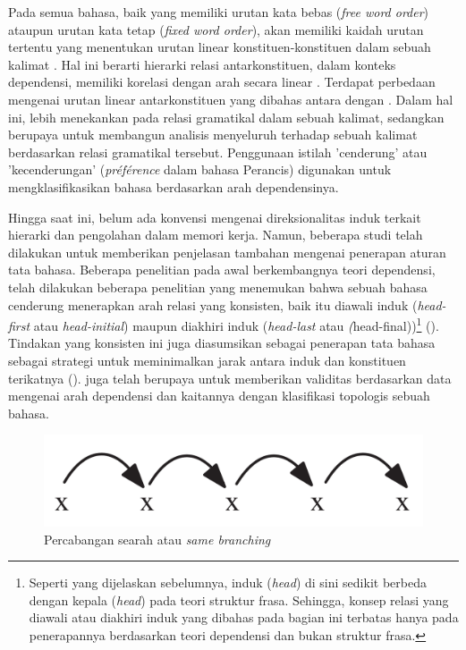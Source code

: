 Pada semua bahasa, baik yang memiliki urutan kata bebas (\textit{free word order}) ataupun urutan kata tetap (\textit{fixed word order}), akan memiliki kaidah urutan tertentu yang menentukan urutan linear konstituen-konstituen dalam sebuah kalimat \citep{tesniere1959elements}. Hal ini berarti hierarki relasi antarkonstituen, dalam konteks dependensi, memiliki korelasi dengan arah secara linear \citep{greenberg1963some}. Terdapat perbedaan mengenai urutan linear antarkonstituen yang dibahas antara \cite{tesniere1959elements} dengan \cite{greenberg1963some}.  Dalam hal ini, \cite{greenberg1963some} lebih menekankan pada relasi gramatikal dalam sebuah kalimat, sedangkan \cite{tesniere1959elements} berupaya untuk membangun analisis menyeluruh terhadap sebuah kalimat berdasarkan relasi gramatikal tersebut. Penggunaan istilah 'cenderung' atau 'kecenderungan' (\textit{pr{\'e}f{\'e}rence} dalam bahasa Perancis) digunakan \cite{tesniere1959elements} untuk mengklasifikasikan bahasa berdasarkan arah dependensinya.

Hingga saat ini, belum ada konvensi mengenai direksionalitas induk terkait hierarki dan pengolahan dalam memori kerja. Namun, beberapa studi telah dilakukan untuk memberikan penjelasan tambahan mengenai penerapan aturan tata bahasa. Beberapa penelitian pada awal berkembangnya teori dependensi, telah dilakukan beberapa penelitian yang menemukan bahwa sebuah bahasa cenderung menerapkan arah relasi yang konsisten, baik itu diawali induk (\textit{head-first} atau \textit{head-initial}) maupun diakhiri induk (\textit{head-last} atau \textit(head-final))\footnote{Seperti yang dijelaskan sebelumnya, induk (\textit{head}) di sini sedikit berbeda dengan kepala (\textit{head}) pada teori struktur frasa. Sehingga, konsep relasi yang diawali atau diakhiri induk yang dibahas pada bagian ini terbatas hanya pada penerapannya berdasarkan teori dependensi dan bukan struktur frasa.} (\citealp{hawkins1994performance, radford1997syntactic, vennemann1994linguistic}). Tindakan yang konsisten ini juga diasumsikan sebagai penerapan tata bahasa sebagai strategi untuk meminimalkan jarak antara induk dan konstituen terikatnya (\citealp{hawkins1994performance, frazier1985syntactic}). \cite{liu2010dependency} juga telah berupaya untuk memberikan validitas berdasarkan data mengenai arah dependensi dan kaitannya dengan klasifikasi topologis sebuah bahasa.

\begin{figure}
	\centering \includegraphics[width=0.5
	\textwidth] {pics/samebranching.png} \caption{Percabangan searah atau \textit{same branching}} 
\label{fig:samebranching} \end{figure}


